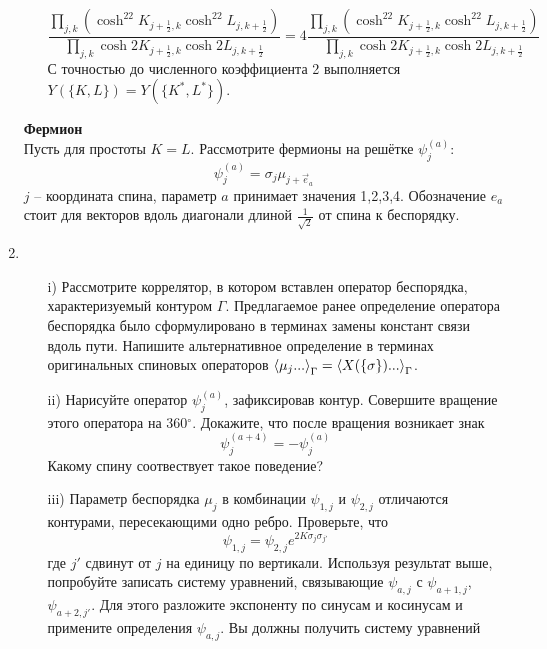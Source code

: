 \documentclass[12pt]{article}
\theoremstyle{definition}
\begin{document}
\begin{enumerate}
\begin{itemize}
    \begin{equation}
        \frac{\prod\limits_{j,k}(\cosh^22K_{j+\frac{1}{2},k}\cosh^22L_{j,k+\frac{1}{2}})}{\prod\limits_{j,k}\cosh2K_{j+\frac{1}{2},k}\cosh2L_{j,k+\frac{1}{2}}}=4\frac{\prod\limits_{j,k}(\cosh^22K_{j+\frac{1}{2},k}\cosh^22L_{j,k+\frac{1}{2}})}{\prod\limits_{j,k}\cosh2K_{j+\frac{1}{2},k}\cosh2L_{j,k+\frac{1}{2}}}
    \end{equation}
    С точностью до численного коэффициента 2 выполняется $Y(\{K,L\})=Y(\{K^*,L^*\})$.
\end{itemize}
\textbf{Фермион}\\
Пусть для простоты $K=L$. Рассмотрите фермионы на решётке $\psi^{(a)}_j$:
\begin{equation}
    \psi^{(a)}_j=\sigma_j\mu_{j+\vec{e}_a}
\end{equation}
$j$ -- координата спина, параметр $a$ принимает значения 1,2,3,4. Обозначение $e_a$ стоит для векторов вдоль диагонали длиной $\frac{1}{\sqrt{2}}$ от спина к беспорядку.
\item
\begin{itemize}
    \item[i)] Рассмотрите коррелятор, в котором вставлен оператор беспорядка, характеризуемый контуром $\Gamma$. Предлагаемое ранее определение оператора беспорядка было сформулировано в терминах замены констант связи вдоль пути. Напишите альтернативное определение в терминах оригинальных спиновых операторов $\braket{\mu_j...}_\Gamma=\braket{X(\{\sigma\})...}_\Gamma$. 
    \item[ii)] Нарисуйте оператор $\psi_j^{(a)}$, зафиксировав контур. Совершите вращение этого оператора на 360$^\circ$. Докажите, что после вращения возникает знак
    \begin{equation}
        \psi_j^{(a+4)}=-\psi_j^{(a)}
    \end{equation}
    Какому спину соотвествует такое поведение?
    \item[iii)] Параметр беспорядка $\mu_j$ в комбинации $\psi_{1,j}$ и $\psi_{2,j}$ отличаются контурами, пересекающими одно ребро. Проверьте, что
    \begin{equation}
        \psi_{1,j}=\psi_{2,j}e^{2K\sigma_j\sigma_{j'}}
    \end{equation}
    где $j'$ сдвинут от $j$ на единицу по вертикали. Используя результат выше, попробуйте записать систему уравнений, связывающие $\psi_{a,j}$ с $\psi_{a+1,j}$, $\psi_{a+2,j'}$. Для этого разложите экспоненту по синусам и косинусам и примените определения $\psi_{a,j}$. Вы должны получить систему уравнений

\end{itemize}
\end{enumerate}
\end{document}
